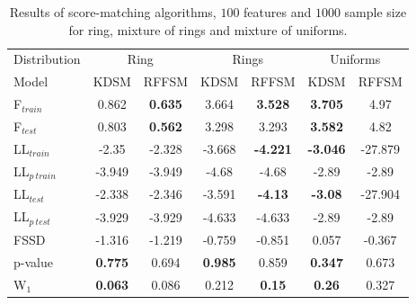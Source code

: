 \begin{table}[H]
    \centering
    \caption{Results of score-matching algorithms, $100$ features and $1000$ sample size for ring, mixture of rings and mixture of uniforms.}
    \label{tab:2d_1000_100_1}    
    \begin{tabular}{lcccccc}
     \toprule
     Distribution & \multicolumn{2}{c}{Ring} & \multicolumn{2}{c}{Rings} & \multicolumn{2}{c}{Uniforms}\\
     Model &  KDSM &  RFFSM &  KDSM &  RFFSM &  KDSM &  RFFSM \\
     \midrule
     F$_{train}$ &           0.862 &      \textbf{0.635} &           3.664 &      \textbf{3.528} &           \textbf{3.705} &       4.97 \\
    F$_{test}$  &           0.803 &     \textbf{ 0.562} &           3.298 &      3.293 &           \textbf{3.582} &       4.82 \\
    LL$_{train}$         &           -2.35 &     -2.328 &          -3.668 &     \textbf{-4.221} &          \textbf{-3.046} &    -27.879 \\
    LL$_{p~train}$    &          -3.949 &     -3.949 &           -4.68 &      -4.68 &           -2.89 &      -2.89 \\
    LL$_{test}$          &          -2.338 &     -2.346 &          -3.591 &      \textbf{-4.13} &           \textbf{-3.08} &    -27.904 \\
    LL$_{p~test}$     &          -3.929 &     -3.929 &          -4.633 &     -4.633 &           -2.89 &      -2.89 \\
    FSSD             &          -1.316 &     -1.219 &          -0.759 &     -0.851 &           0.057 &     -0.367 \\
    p-value          &           \textbf{0.775} &      0.694 &           \textbf{0.985} &      0.859 &           \textbf{0.347} &      0.673 \\
    W$_1$               &       \textbf{0.063} &  0.086 &        0.212 &   \textbf{0.15} &        \textbf{0.26} &   0.327 \\

     \bottomrule
\end{tabular}
\end{table}



